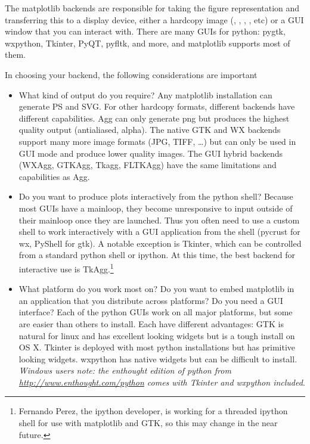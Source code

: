 \documentclass[twoside]{book}
\begin{document}
The matplotlib backends are responsible for taking the figure
representation and transferring this to a display device, either a
hardcopy image (, , ,
, etc) or a GUI window that you can interact with.  There
are many GUIs for python: pygtk, wxpython, Tkinter, PyQT, pyfltk, and
more, and matplotlib supports most of them.  

In choosing your backend, the following considerations are important

\begin{itemize}
\item What kind of output do you require?  Any matplotlib installation
  can generate PS and SVG.  For other hardcopy formats, different
  backends have different capabilities.  Agg can only generate png but
  produces the highest quality output (antialiased, alpha).  The
  native GTK and WX backends support many more image formats (JPG,
  TIFF, \dots) but can only be used in GUI mode and produce lower
  quality images.  The GUI hybrid backends (WXAgg, GTKAgg, Tkagg,
  FLTKAgg) have the same limitations and capabilities as Agg.
  
\item Do you want to produce plots interactively from the python
  shell?  Because most GUIs have a mainloop, they become unresponsive
  to input outside of their mainloop once they are launched.  Thus you
  often need to use a custom shell to work interactively with a GUI
  application from the shell (pycrust for wx, PyShell for gtk).  A
  notable exception is Tkinter, which can be controlled from a
  standard python shell or ipython.  At this time, the best backend
  for interactive use is TkAgg.\footnote{Fernando Perez, the
  ipython developer, is working for a threaded ipython shell for use
  with matplotlib and GTK, so this may change in the near future.}

\item What platform do you work most on?  Do you want to embed
  matplotlib in an application that you distribute across platforms?
  Do you need a GUI interface?  Each of the python GUIs work on all
  major platforms, but some are easier than others to install.  Each
  have different advantages: GTK is natural for linux and has
  excellent looking widgets but is a tough install on OS X.  Tkinter
  is deployed with most python installations but has primitive looking
  widgets.  wxpython has native widgets but can be difficult to
  install.  \textit{Windows users note: the enthought edition of
  python from \url{http://www.enthought.com/python} comes with Tkinter
  and wxpython included}.
  

\end{itemize}
\end{document}
